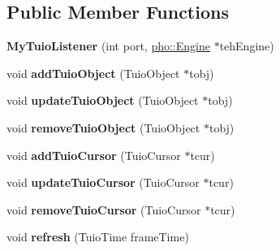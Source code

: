 \subsection*{Public Member Functions}
\begin{DoxyCompactItemize}
\item 
\hypertarget{classpho_1_1MyTuioListener_a723fc12e6a63d9efabe8562a9ae53cb2}{{\bfseries My\-Tuio\-Listener} (int port, \hyperlink{classpho_1_1Engine}{pho\-::\-Engine} $\ast$teh\-Engine)}\label{classpho_1_1MyTuioListener_a723fc12e6a63d9efabe8562a9ae53cb2}

\item 
\hypertarget{classpho_1_1MyTuioListener_a67f3747d7d927ca7e0d8f4a60f8a33ad}{void {\bfseries add\-Tuio\-Object} (Tuio\-Object $\ast$tobj)}\label{classpho_1_1MyTuioListener_a67f3747d7d927ca7e0d8f4a60f8a33ad}

\item 
\hypertarget{classpho_1_1MyTuioListener_ab24eab81f3e7e0f26de1086f0e5e82e4}{void {\bfseries update\-Tuio\-Object} (Tuio\-Object $\ast$tobj)}\label{classpho_1_1MyTuioListener_ab24eab81f3e7e0f26de1086f0e5e82e4}

\item 
\hypertarget{classpho_1_1MyTuioListener_ad97047ec5946ac6d9983baad23e8ab16}{void {\bfseries remove\-Tuio\-Object} (Tuio\-Object $\ast$tobj)}\label{classpho_1_1MyTuioListener_ad97047ec5946ac6d9983baad23e8ab16}

\item 
\hypertarget{classpho_1_1MyTuioListener_a70d7553cb210b29c61ad1a0b7b44c8cf}{void {\bfseries add\-Tuio\-Cursor} (Tuio\-Cursor $\ast$tcur)}\label{classpho_1_1MyTuioListener_a70d7553cb210b29c61ad1a0b7b44c8cf}

\item 
\hypertarget{classpho_1_1MyTuioListener_a255070e3b74c2e40be6a1926e75c354a}{void {\bfseries update\-Tuio\-Cursor} (Tuio\-Cursor $\ast$tcur)}\label{classpho_1_1MyTuioListener_a255070e3b74c2e40be6a1926e75c354a}

\item 
\hypertarget{classpho_1_1MyTuioListener_a03eb721df2ac2869abf5894eb5caf24e}{void {\bfseries remove\-Tuio\-Cursor} (Tuio\-Cursor $\ast$tcur)}\label{classpho_1_1MyTuioListener_a03eb721df2ac2869abf5894eb5caf24e}

\item 
\hypertarget{classpho_1_1MyTuioListener_a40fa32b8f8bee2f45434178bc6e943b1}{void {\bfseries refresh} (Tuio\-Time frame\-Time)}\label{classpho_1_1MyTuioListener_a40fa32b8f8bee2f45434178bc6e943b1}

\end{DoxyCompactItemize}
